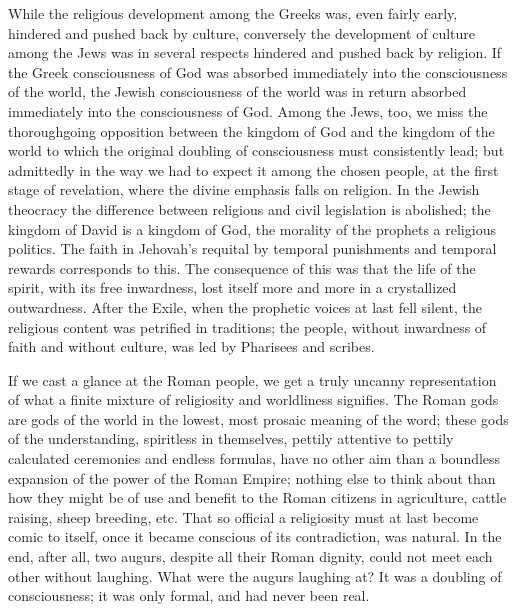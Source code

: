 \documentclass[12pt]{book}
\newcommand{\opage}[1]{\marginnote{\footnotesize\textit{[#1]}}}
\begin{document}
While the religious development among the Greeks was, even fairly early,
hindered and pushed back by culture, conversely the development of
culture among the Jews was in several respects hindered and pushed back
by religion. If the Greek consciousness of God was absorbed immediately
into the consciousness of the world, the Jewish consciousness of the
world was in return absorbed immediately into the consciousness of God.
Among the Jews, too, we miss the thoroughgoing opposition between the
kingdom of God and the kingdom of the world to which the original
doubling of consciousness must consistently lead; but
\opage{50}\setcounter{footnote}{0}%
admittedly in the way we had to expect it among
the chosen people, at the first stage of revelation, where the divine
emphasis falls on religion. In the Jewish theocracy the difference
between religious and civil legislation is abolished; the kingdom of
David is a kingdom of God, the morality of the prophets a religious
politics. The faith in Jehovah's requital by temporal punishments and
temporal rewards corresponds to this. The consequence of this was that
the life of the spirit, with its free inwardness, lost itself more and
more in a crystallized outwardness. After the Exile, when the prophetic
voices at last fell silent, the religious content was petrified in
traditions; the people, without inwardness of faith and without culture,
was led by Pharisees and scribes.

If we cast a glance at the Roman people, we get a truly uncanny
representation of what a finite mixture of religiosity and worldliness
signifies. The Roman gods are gods of the world in the lowest, most
prosaic meaning of the word; these gods of the understanding, spiritless
in themselves, pettily attentive to pettily calculated ceremonies and
endless formulas, have no other aim than a boundless expansion of the
power of the Roman Empire; nothing else to think about than how they
might be of use and benefit to the Roman citizens in agriculture, cattle
raising, sheep breeding, etc. That so official a religiosity must at
last become comic to itself, once it became conscious of its
contradiction, was natural. In the end, after all, two augurs, despite
all their Roman dignity, could not meet each other without laughing.
What were the augurs laughing at? It was a doubling of consciousness; it
was only formal, and had never been real.
\end{document}
